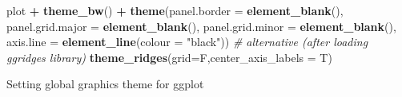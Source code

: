 \documentclass[10,portrait]{article}
\newenvironment{Shaded}{\begin{snugshade}}{\end{snugshade}}
\newcommand{\KeywordTok}[1]{\textcolor[rgb]{0.13,0.29,0.53}{\textbf{#1}}}
\newcommand{\DataTypeTok}[1]{\textcolor[rgb]{0.13,0.29,0.53}{#1}}
\newcommand{\StringTok}[1]{\textcolor[rgb]{0.31,0.60,0.02}{#1}}
\newcommand{\CommentTok}[1]{\textcolor[rgb]{0.56,0.35,0.01}{\textit{#1}}}
\newcommand{\OperatorTok}[1]{\textcolor[rgb]{0.81,0.36,0.00}{\textbf{#1}}}
\newcommand{\NormalTok}[1]{#1}
\begin{document}
\begin{Shaded}
\begin{Highlighting}[]
\NormalTok{plot }\OperatorTok{+}\StringTok{ }\KeywordTok{theme_bw}\NormalTok{() }\OperatorTok{+}\StringTok{ }
\StringTok{  }\KeywordTok{theme}\NormalTok{(}\DataTypeTok{panel.border =} \KeywordTok{element_blank}\NormalTok{(), }\DataTypeTok{panel.grid.major =} \KeywordTok{element_blank}\NormalTok{(),}
                            \DataTypeTok{panel.grid.minor =} \KeywordTok{element_blank}\NormalTok{(), }\DataTypeTok{axis.line =} \KeywordTok{element_line}\NormalTok{(}\DataTypeTok{colour =} \StringTok{"black"}\NormalTok{))}
\CommentTok{# alternative (after loading ggridges library)}
\KeywordTok{theme_ridges}\NormalTok{(}\DataTypeTok{grid=}\NormalTok{F,}\DataTypeTok{center_axis_labels =}\NormalTok{ T)}
\end{Highlighting}
\end{Shaded}

Setting global graphics theme for ggplot
\end{document}
